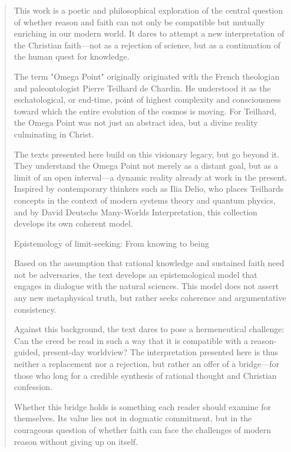 \documentclass[
  ngerman,
]{article}
\begin{document}
\begin{quote}
This work is a poetic and philosophical exploration of the central
question of whether reason and faith can not only be compatible but
mutually enriching in our modern world. It dares to attempt a new
interpretation of the Christian faith---not as a rejection of science,
but as a continuation of the human quest for knowledge.

The term "Omega Point" originally originated with the French theologian
and paleontologist Pierre Teilhard de Chardin. He understood it as the
eschatological, or end-time, point of highest complexity and
consciousness toward which the entire evolution of the cosmos is moving.
For Teilhard, the Omega Point was not just an abstract idea, but a
divine reality culminating in Christ.

The texts presented here build on this visionary legacy, but go beyond
it. They understand the Omega Point not merely as a distant goal, but as
a limit of an open interval---a dynamic reality already at work in the
present. Inspired by contemporary thinkers such as Ilia Delio, who
places Teilhard\textquotesingle s concepts in the context of modern
systems theory and quantum physics, and by David
Deutsch\textquotesingle s Many-Worlds Interpretation, this collection
develops its own coherent model.

Epistemology of limit-seeking: From knowing to being

Based on the assumption that rational knowledge and sustained faith need
not be adversaries, the text develops an epistemological model that
engages in dialogue with the natural sciences. This model does not
assert any new metaphysical truth, but rather seeks coherence and
argumentative consistency.

Against this background, the text dares to pose a hermeneutical
challenge: Can the creed be read in such a way that it is compatible
with a reason-guided, present-day worldview? The interpretation
presented here is thus neither a replacement nor a rejection, but rather
an offer of a bridge---for those who long for a credible synthesis of
rational thought and Christian confession.

Whether this bridge holds is something each reader should examine for
themselves. Its value lies not in dogmatic commitment, but in the
courageous question of whether faith can face the challenges of modern
reason without giving up on itself.


\end{quote}
\end{document}
